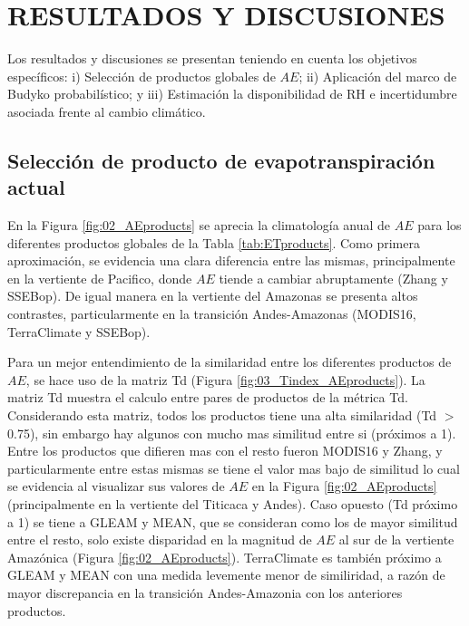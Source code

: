 \documentclass[12pt]{article}
\begin{document}
\clearpage
\vspace*{0.5mm}
\section{RESULTADOS Y DISCUSIONES}

Los resultados y discusiones se presentan teniendo en cuenta los objetivos específicos: i) Selección de productos globales de $AE$; ii) Aplicación del marco de Budyko probabilístico; y iii) Estimación la disponibilidad de RH e incertidumbre asociada frente al cambio climático.

\subsection{Selección de producto de evapotranspiración actual}

En la Figura \ref{fig:02_AEproducts} se aprecia la climatología anual de $AE$ para los diferentes productos globales de la Tabla \ref{tab:ETproducts}. Como primera aproximación, se evidencia una clara diferencia entre las mismas, principalmente en la vertiente de Pacifico, donde $AE$ tiende a cambiar abruptamente (Zhang y SSEBop). De igual manera en la vertiente del Amazonas se presenta altos contrastes, particularmente en la transición Andes-Amazonas (MODIS16, TerraClimate y SSEBop). 



Para un mejor entendimiento de la similaridad entre los diferentes productos de $AE$, se hace uso de la matriz Td (Figura \ref{fig:03_Tindex_AEproducts}). La matriz Td muestra el calculo entre pares de productos de la métrica Td. Considerando esta matriz, todos los productos tiene una alta similaridad (Td $>$ 0.75), sin embargo hay algunos con mucho mas similitud entre si (próximos a 1). Entre los productos que difieren mas con el resto fueron MODIS16 y Zhang, y particularmente entre estas mismas se tiene el valor mas bajo de similitud lo cual se evidencia al visualizar sus valores de $AE$ en la Figura \ref{fig:02_AEproducts} (principalmente en la vertiente del Titicaca y Andes). Caso opuesto (Td próximo a 1) se tiene a GLEAM y MEAN, que se consideran como los de mayor similitud entre el resto, solo existe disparidad en la magnitud de $AE$ al sur de la vertiente Amazónica (Figura \ref{fig:02_AEproducts}). TerraClimate es también próximo a GLEAM y MEAN con una medida levemente menor de similiridad, a razón de mayor discrepancia en la transición Andes-Amazonia con los anteriores productos.
\end{document}
